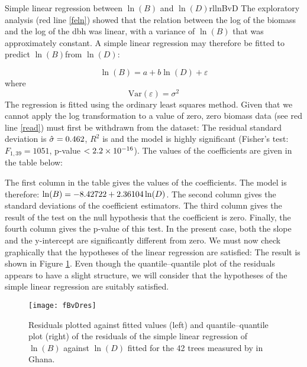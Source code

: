 \begin{filrouge}{Simple linear regression between $\ln(B)$ and $\ln(D)$}{rllnBvD}%
The exploratory analysis (red line \ref{feln}) showed that the relation between the log of the biomass and the log of the dbh was linear, with a variance of $\ln(B)$ that was approximately constant. A simple linear regression may therefore be fitted to predict $\ln(B)$from $\ln(D)$:

\[
\ln(B)=a+b\ln(D)+\varepsilon
\]
where
\[
\mathrm{Var}(\varepsilon)=\sigma^2
\]
The regression is fitted using the ordinary least squares method. Given that we cannot apply the log transformation to a value of zero, zero biomass data (see red line \ref{read}) must first be withdrawn from the dataset:
%
The residual standard deviation is $\hat{\sigma}=\mbox{0.462}$, $R^2$ is  and the model is highly significant (Fisher's test: $F_{1,39}=1051$, p-value $<\mbox{2.2}\times10^{-16}$). The values of the coefficients are given in the table below:

%
The first column in the table gives the values of the coefficients. The model is therefore:
$\ln(B)=-\mbox{8.42722}+\mbox{2.36104}\ln(D)$. The second column gives the standard deviations of the coefficient estimators. The third column gives the result of the test on the null hypothesis that the coefficient is zero. Finally, the fourth column gives the p-value of this test. In the present case, both the slope and the y-intercept are significantly different from zero.
We must now check graphically that the hypotheses of the linear regression are satisfied:
%
The result is shown in  Figure \ref{fBvDres}. Even though the quantile--quantile plot of the residuals appears to have a slight structure, we will consider that the hypotheses of the simple linear regression are suitably satisfied.
\end{filrouge}

\begin{figure}[htb]
\texttt{[image: fBvDres]}
\caption[Residuals plotted against fitted values and quantile--quantile plot of the residuals of the simple linear regression of $\ln(B)$ against $\ln(D)$ fitted for the 42 trees measured by \citet{henry10} in Ghana]{Residuals plotted against fitted values (left) and quantile--quantile plot (right) of the residuals of the simple linear regression of $\ln(B)$ against $\ln(D)$ fitted for the 42 trees measured by \citet{henry10} in Ghana.\label{fBvDres}}
\end{figure}

